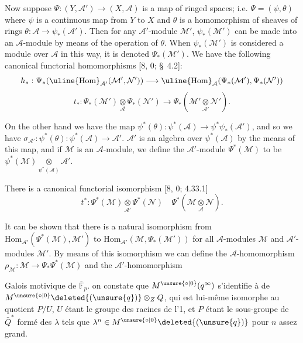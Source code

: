 Now suppose $\Psi:(Y,\mathcal A')\to(X,\mathcal A)$ is a map of ringed spaces; i.e. $\Psi=(\psi,\theta)$ where $\psi$ is a continuous map from $Y$ to $X$ and $\theta$ is a homomorphism of sheaves of rings $\theta:\mathcal A\to\psi_*(\mathcal A')$. Then for any $\mathcal A'$-module $\mathcal M'$, $\psi_*(\mathcal M')$ can be made into an $\mathcal A$-module by means of the operation of $\theta$. When $\psi_*(\mathcal M')$ is considered a module over $\mathcal A$ in this way, it is denoted $\Psi_*(\mathcal M')$. We have the following canonical functorial homomorphisms [8, 0; \S\ 4.2]:
\[
h_*:\Psi_*(\uline{\mathrm{Hom}}_{\mathcal A'}(\mathcal M',\mathcal N'))\longrightarrow\uline{\mathrm{Hom}}_{\mathcal A}(\Psi_*(\mathcal M'),\Psi_*(\mathcal N'))
\]
\[
t_*:\Psi_*(\mathcal M')\underset{\mathcal A}{\otimes}\Psi_*(\mathcal N')\longrightarrow\Psi_*(\mathcal M'\underset{\mathcal A'}{\otimes}\mathcal N').
\]

On the other hand we have the map $\psi^*(\theta):\psi^*(\mathcal A)\to\psi^*\psi_*(\mathcal A')$, and so we have $\sigma_{\mathcal A'}:\psi^*(\theta):\psi^*(\mathcal A)\to\mathcal A'$. $\mathcal A'$ is an algebra over $\psi^*(\mathcal A)$ by the means of this map, and if $\mathcal M$ is an $\mathcal A$-module, we define the $\mathcal A'$-module $\Psi^*(\mathcal M)$ to be $\psi^*(\mathcal M)\underset{\psi^*(\mathcal A)}{\otimes}\mathcal A'$.

There is a canonical functorial isomorphism [8, 0; 4.33.1]
\[
t^*:\Psi^*(\mathcal M)\underset{\mathcal A'}{\otimes}\Psi^*(\mathcal N)\quad\Psi^*(\mathcal M\underset{\mathcal A}{\otimes}\mathcal N).
\]

It can be shown that there is a natural isomorphism from $\mathrm{Hom}_{\mathcal A'}(\Psi^*(\mathcal M),\mathcal M')$ to $\mathrm{Hom}_{\mathcal A'}(\mathcal M,\Psi_*(\mathcal M'))$ for all $\mathcal A$-modules $\mathcal M$ and $\mathcal A'$-modules $\mathcal M'$. By means of this isomorphism we can define the $\mathcal A$-homomorphism $\rho_{\mathcal M}:\mathcal M\to\Psi_*\Psi^*(\mathcal M)$ and the $\mathcal A'$-homomorphism



Galois motivique de $\overline{\mathbb F}_p$. 
on constate que $M^{\unsure{\circ|0}}(q^\infty)$  s'identifie à  de $M^{\unsure{\circ|0}}\deleted{(\unsure{q})}\otimes_ZQ$, qui est lui-même isomorphe au quotient $P/U$, $U$ étant le groupe des racines de l'1, et $P$ étant le sous-groupe de $\bar Q^*$ formé des $\lambda$ tels que $\lambda^n\in M^{\unsure{\circ|0}}\deleted{(\unsure{q})}$ pour $n$ assez grand.

